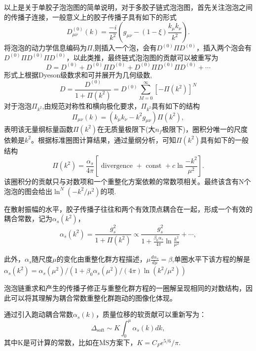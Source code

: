 以上是关于单胶子泡泡图的简单说明，对于多胶子链式泡泡图，首先关注泡泡之间的传播子连接，一般意义上的胶子传播子具有如下的形式
$$
D_{\mu \nu}^{(0)}(k)=\frac{-i}{k^2}\left(g_{\mu \nu}-(1-\xi) \frac{k_\mu k_\nu}{k^2}\right) .
$$
将泡泡的动力学信息编码为$\Pi$,则插入一个泡，会有$D^{(0)}\Pi D^{(0)}$，插入两个泡会有$D^{(0)}\Pi D^{(0)}\Pi D^{(0)}$，以此类推，最终链式泡泡图的贡献可以被重写为
$$
D=D^{(0)}+D^{(0)} \Pi D^{(0)}+D^{(0)} \Pi D^{(0)} \Pi D^{(0)}+\cdots
$$
形式上根据Dyeson级数求和可并展开为几何级数,
$$D=\frac{D^{(0)}}{1+\Pi(k^2)}=D^{(0)}\sum_{M=0}^{\infty}[-\Pi(k^2)]^N$$
对于泡泡$\Pi_{k^2}$,由规范对称性和横向极化要求，$\Pi_{k^2}$具有如下的结构
$$\Pi_{\mu \nu}(k)=\left(k_\mu k_\nu-k^2 g_{\mu \nu}\right) \Pi\left(k^2\right),$$
表明该无量纲标量函数$\Pi(k^2)$在无质量极限下(大$n_f$极限下)，圈积分唯一的尺度依赖是$k^2$。根据标准圈图计算结果，通过量纲分析，可知$\Pi(k^2)$具有如下的一般结构
\begin{equation}
\Pi\left(k^2\right)=\frac{\alpha_s}{4 \pi}\left[\text { divergence }+ \text { const }+c \ln \frac{-k^2}{\mu^2}\right] .
\end{equation}
该圈积分的贡献只与对数项和一个重整化方案依赖的常数项相关。最终该含有N个泡泡的图会给出$\ln^{N}(-k^2/\mu^2)$的项.

在散射振幅的水平，胶子传播子往往和两个有效顶点耦合在一起，形成一个有效的耦合常数，记为$\alpha_s(k^2)$，
\begin{equation}
  \alpha_s(k^2)=\frac{g_s^2}{1+\Pi(k^2)}\propto \frac{g_s^2}{1+\frac{\beta_0 \alpha_s}{4 \pi} \ln \frac{k^2}{\mu^2}}+\cdots,
  \label{eq: alphas_running}
\end{equation}

此外，$\alpha_s$随尺度$\mu$的变化由重整化群方程描述，$\mu \frac{d\alpha_s}{d\mu}=\beta$,单圈水平下该方程的解是
$\alpha_s(k^2)=\alpha_s(\mu^2)/(1+\beta_0 \alpha_s(\mu^2)/(4 \pi) \ln(k^2/\mu^2))$

泡泡链重求和产生的传播子修正与重整化群方程的一圈解呈现相同的对数结构，因此可以将其理解为耦合常数重整化群跑动的图像化体现\cite{Papavassiliou_1997}。

通过引入跑动耦合常数$\alpha_s(k)$，质量位移的软贡献可以重新写为：
\begin{equation}
  \Delta_{\mathrm{soft}} \sim K\int_{0}^{\mu} \alpha_s(k) dk, 
\end{equation}
其中K是可计算的常数，比如在$\overline{\text{MS}}$方案下，$K=C_{F} e^{5/6}/\pi$.
